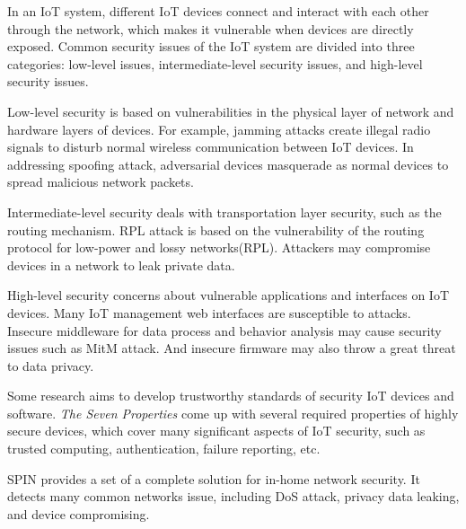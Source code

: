In an IoT system, different IoT devices connect and interact with each other through the network, which makes it vulnerable when devices are directly exposed. 
Common security issues of the IoT system are divided into three categories: low-level issues, intermediate-level security issues, and high-level security issues.

Low-level security is based on vulnerabilities in the physical layer of network and hardware layers of devices. 
For example, jamming attacks create illegal radio signals to disturb normal wireless communication between IoT devices\cite{xu2005feasibility,noubir2003low}. 
In addressing spoofing attack, adversarial devices masquerade as normal devices to spread malicious network packets\cite{chen2007detecting}.

Intermediate-level security deals with transportation layer security, such as the routing mechanism. 
RPL attack is based on the vulnerability of the routing protocol for low-power and lossy networks(RPL)\cite{dvir2011vera}. 
Attackers may compromise devices in a network to leak private data.

High-level security concerns about vulnerable applications and interfaces on IoT devices. 
Many IoT management web interfaces are susceptible to attacks\cite{owasp2016url}. 
Insecure middleware for data process and behavior analysis may cause security issues such as MitM attack\cite{conzon2012virtus,levy2015ownership}. 
And insecure firmware may also throw a great threat to data privacy\cite{owasp2016url}.

Some research aims to develop trustworthy standards of security IoT devices and software. 
\textit{The Seven Properties}\cite{hunt2017the} come up with several required properties of highly secure devices, which cover many significant aspects of IoT security, such as trusted computing, authentication, failure reporting, etc.

SPIN\cite{hesselman2017spin} provides a set of a complete solution for in-home network security. 
It detects many common networks issue, including DoS attack, privacy data leaking, and device compromising.
